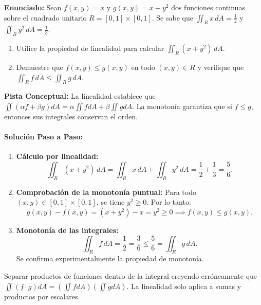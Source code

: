 \documentclass[11pt,a4paper]{article}
\begin{document}
\begin{tcolorbox}[colback=white,colframe=gray!40,arc=1mm,boxrule=0.5pt,left=3mm,right=3mm,top=2mm,bottom=2mm]
\textbf{Enunciado:} Sean $f(x,y) = x$ y $g(x,y) = x + y^2$ dos funciones continuas sobre el cuadrado unitario $R = [0,1] \times [0,1]$. Se sabe que $\iint_R x \, dA = \frac{1}{2}$ y $\iint_R y^2 \, dA = \frac{1}{3}$.
\begin{enumerate}[label=\textbf{\alph*)}]
\item Utilice la propiedad de linealidad para calcular $\iint_R (x + y^2) \, dA$.
\item Demuestre que $f(x,y) \le g(x,y)$ en todo $(x,y) \in R$ y verifique que $\iint_R f \, dA \le \iint_R g \, dA$.
\end{enumerate}
\end{tcolorbox}

\begin{tcolorbox}[colback=yellow!4,colframe=accentamber!70,arc=1mm,boxrule=0.5pt,left=3mm,right=3mm,top=1.5mm,bottom=1.5mm]
\textbf{Pista Conceptual:} La linealidad establece que $\iint (\alpha f + \beta g) dA = \alpha \iint f dA + \beta \iint g dA$. La monotonía garantiza que si $f \le g$, entonces sus integrales conservan el orden.
\end{tcolorbox}

\paragraph{Solución Paso a Paso:}\par
\begin{enumerate}[label=\textbf{\arabic*.}]
\item \textbf{Cálculo por linealidad:}
\[ \iint_R (x + y^2) \, dA = \iint_R x \, dA + \iint_R y^2 \, dA = \frac{1}{2} + \frac{1}{3} = \frac{5}{6}. \]
\item \textbf{Comprobación de la monotonía puntual:}
Para todo $(x,y) \in [0,1] \times [0,1]$, se tiene $y^2 \ge 0$. Por lo tanto:
\[ g(x,y) - f(x,y) = (x + y^2) - x = y^2 \ge 0 \implies f(x,y) \le g(x,y). \]
\item \textbf{Monotonía de las integrales:}
\[ \iint_R f \, dA = \frac{1}{2} = \frac{3}{6} \le \frac{5}{6} = \iint_R g \, dA. \]
Se confirma experimentalmente la propiedad de monotonía.
\end{enumerate}

\begin{trapbox}
Separar productos de funciones dentro de la integral creyendo erróneamente que $\iint (f \cdot g) dA = (\iint f dA)(\iint g dA)$. La linealidad solo aplica a sumas y productos por escalares.
\end{trapbox}
\end{document}
